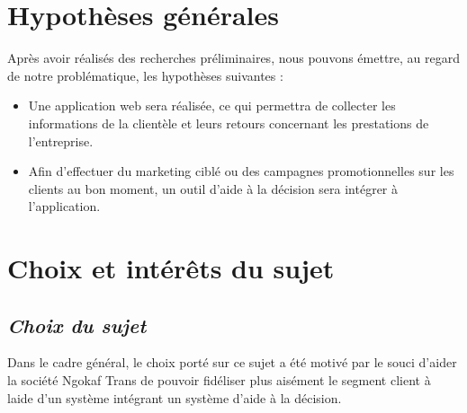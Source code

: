    \section[Hypothèses générales]{Hypothèses générales}
    Après avoir réalisés des recherches préliminaires, nous pouvons émettre, au regard
    de notre problématique, les hypothèses suivantes :
    \par
        \begin{itemize}
            \setlength{\itemsep}{0pt}
            \item [\ding{226}] Une application web sera réalisée, ce qui permettra de collecter
            les informations de la clientèle et leurs retours concernant les prestations de l’entreprise.
            \item [\ding{226}] Afin d’effectuer du marketing ciblé ou des campagnes
            promotionnelles sur les clients au bon moment,
            un outil d’aide à la décision sera intégrer à l’application.
        \end{itemize}
    \section[Choix et interet du sujet]{Choix et intérêts du sujet}
        \subsection[Choix du sujet]{\textit{Choix du sujet}}
        Dans le cadre général, le choix porté sur ce sujet a été motivé par le souci d’aider
        la société Ngokaf Trans de pouvoir fidéliser plus aisément le segment client à laide d’un
        système intégrant un système d’aide à la décision.
